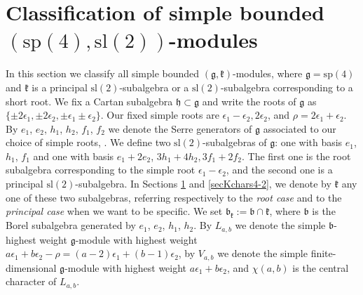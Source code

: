 \documentclass[12pt]{amsart}
\theoremstyle{plain} %
\renewcommand{\sl}{\mathrm{sl}}
\renewcommand{\sp}{\mathrm{sp}}
\newcommand{\kk}{\mathfrak{k}}
\newcommand{\hh}{\mathfrak{h}}
\renewcommand{\gg}{\mathfrak{g}}
\newcommand{\bb}{\mathfrak{b}}
\newcommand{\eps}{\epsilon}
\begin{document}
\section{Classification of simple bounded $(\sp(4),\sl(2))$-modules}\label{se6}
In this section we classify all simple bounded $(\gg,\kk)$-modules,
where $\gg=\sp(4)$ and $\kk$ is a principal $\sl(2)$-subalgebra or a
$\sl(2)$-subalgebra corresponding to a short root. We fix a Cartan
subalgebra $\hh\subset\gg$ and write the roots of $\gg$ as $\{\pm
2\eps_1,\pm 2\eps_2, \pm\eps_1\pm\eps_2\}$. Our fixed simple roots are
$\eps_1-\eps_2, 2\eps_2$, and $\rho=2\eps_1+\eps_2$. By $e_1$, $e_2$,
$h_1$, $h_2$, $f_1$, $f_2$ we denote the Serre generators of $\gg$
associated to our choice of simple roots, \cite{OV}. We define two
$\sl(2)$-subalgebras of $\gg$: one with basis $e_1$, $h_1$, $f_1$ and
one with basis $e_1+2e_2$, $3h_1+4h_2,3f_1+2f_2$. The first one is the
root subalgebra corresponding to the simple root $\eps_1-\eps_2$, and
the second one is a principal $\sl(2)$-subalgebra. In Sections
\ref{se6} and \ref{secKchars4-2}, we denote by $\kk$ any one of these
two subalgebras, referring respectively to the \emph{root case} and to
the \emph{principal case} when we want to be specific. We set
$\bb_\kk:=\bb\cap \kk$, where $\bb$ is the Borel subalgebra 
generated by $e_1$, $e_2$, $h_1$, $h_2$. By
$L_{a,b}$ we denote the simple $\bb$-highest weight $\gg$-module with
highest weight $a\eps_1+b\eps_2-\rho=(a-2)\eps_1+(b-1)\eps_2$, by
$V_{a,b}$ we denote the simple finite-dimensional $\gg$-module with
highest weight $a\eps_1+b\eps_2$, and $\chi(a,b)$ is the central character of $L_{a,b}$.
\end{document}
